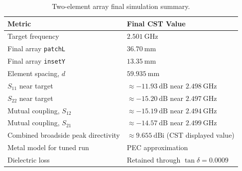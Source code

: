 \begin{table}[H]
\centering
\caption{Two-element array final simulation summary.}
\label{tab:array-final-summary}
\begin{tabular}{@{}ll@{}}
\toprule
\textbf{Metric} & \textbf{Final CST Value} \\
\midrule
Target frequency & \(2.501~\mathrm{GHz}\) \\
Final array \texttt{patchL} & \(36.70~\mathrm{mm}\) \\
Final array \texttt{insetY} & \(13.35~\mathrm{mm}\) \\
Element spacing, \(d\) & \(59.935~\mathrm{mm}\) \\
\(S_{11}\) near target & \(\approx -11.93~\mathrm{dB}\) near \(2.498~\mathrm{GHz}\) \\
\(S_{22}\) near target & \(\approx -15.20~\mathrm{dB}\) near \(2.497~\mathrm{GHz}\) \\
Mutual coupling, \(S_{12}\) & \(\approx -15.19~\mathrm{dB}\) near \(2.494~\mathrm{GHz}\) \\
Mutual coupling, \(S_{21}\) & \(\approx -14.57~\mathrm{dB}\) near \(2.499~\mathrm{GHz}\) \\
Combined broadside peak directivity & \(\approx 9.655~\mathrm{dBi}\) (CST displayed value) \\
Metal model for tuned run & PEC approximation \\
Dielectric loss & Retained through \(\tan\delta=0.0009\) \\
\bottomrule
\end{tabular}
\end{table}
